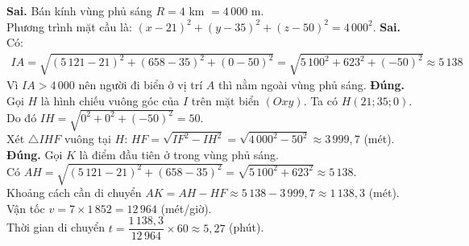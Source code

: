 \begin{ex}
{\begin{center}
		\end{center}
		\begin{itemchoice}
			\itemch \textbf{Sai.} Bán kính vùng phủ sáng $R = 4$ km $= 4\,000$ m. \\
			Phương trình mặt cầu là: $(x-21)^2 + (y-35)^2 + (z-50)^2 = 4\,000^2$.
			\itemch \textbf{Sai.}  Có:
			\begin{eqnarray*}
				IA = \sqrt{(5\,121-21)^2 + (658-35)^2 + (0-50)^2} = \sqrt{5\,100^2 + 623^2 + (-50)^2} \approx 5\,138
			\end{eqnarray*}
			Vì $ IA > 4\,000$ nên người đi biển ở vị trí $A$ thì nằm ngoài vùng phủ sáng.
			\itemch \textbf{Đúng.} Gọi $H$ là hình chiếu vuông góc của $I$ trên mặt biển $(Oxy)$. Ta có $H(21; 35; 0)$.\\
			Do đó $IH = \sqrt{0^2 + 0^2 + (-50)^2} = 50$.\\
			Xét $\triangle IHF$ vuông tại $H$: $HF = \sqrt{IF^2 - IH^2} = \sqrt{4\,000^2 - 50^2} \approx 3\,999{,}7$ (mét).
			\itemch \textbf{Đúng.} Gọi $K$ là điểm đầu tiên ở trong vùng phủ sáng.\\
			Có $AH = \sqrt{(5\,121-21)^2 + (658-35)^2} = \sqrt{5\,100^2 + 623^2} \approx 5\,138$.\\
			Khoảng cách cần di chuyển $AK = AH - HF \approx 5\,138 - 3\,999{,}7 \approx 1\,138{,}3$ (mét).\\
			Vận tốc $v = 7 \times 1\,852 = 12\,964$ (mét/giờ).\\
			Thời gian di chuyển $t = \dfrac{1\,138,3}{12\,964} \times 60 \approx 5{,}27$ (phút).
		\end{itemchoice}
	}
\end{ex}

